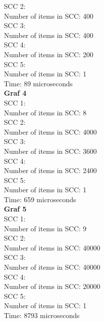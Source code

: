 \documentclass[15pt, a4paper]{article}
\begin{document}
SCC 2: \\
Number of items in SCC: 400 \\

SCC 3: \\
Number of items in SCC: 400 \\

SCC 4: \\
Number of items in SCC: 200 \\

SCC 5: \\
Number of items in SCC: 1 \\

Time: 89 microseconds \\

\textbf{Graf 4} \\
SCC 1: \\
Number of items in SCC: 8 \\

SCC 2: \\
Number of items in SCC: 4000 \\

SCC 3: \\
Number of items in SCC: 3600 \\

SCC 4: \\
Number of items in SCC: 2400 \\

SCC 5: \\
Number of items in SCC: 1 \\

Time: 659 microseconds \\

\textbf{Graf 5} \\
SCC 1: \\
Number of items in SCC: 9 \\

SCC 2: \\
Number of items in SCC: 40000 \\

SCC 3: \\
Number of items in SCC: 40000 \\

SCC 4: \\
Number of items in SCC: 20000 \\

SCC 5: \\
Number of items in SCC: 1 \\

Time: 8793 microseconds \\
\end{document}
